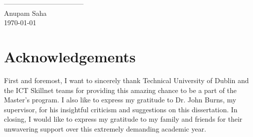 \documentclass[12pt]{article}
\begin{document}
\vspace{2cm}
\begin{flushright}
-----------------------------------\\
Anupam Saha\\
\today
\end{flushright}
\pagebreak

\section*{Acknowledgements}
First and foremost, I want to sincerely thank Technical University of Dublin and the ICT Skillnet teams for providing this amazing chance to be a part of the Master's program. I also like to express my gratitude to Dr. John Burns, my supervisor, for his insightful criticism and suggestions on this dissertation. In closing, I would like to express my gratitude to my family and friends for their unwavering support over this extremely demanding academic year.
\pagebreak

\listoffigures
\pagebreak


\listoftables
\pagebreak


\printglossary[type=\acronymtype] %
\printglossary                    %
\pagebreak


\tableofcontents
\pagebreak



\pagebreak



\pagebreak



\pagebreak



\pagebreak



\pagebreak



\pagebreak



\pagebreak



\pagebreak


\printbibliography
\end{document}
